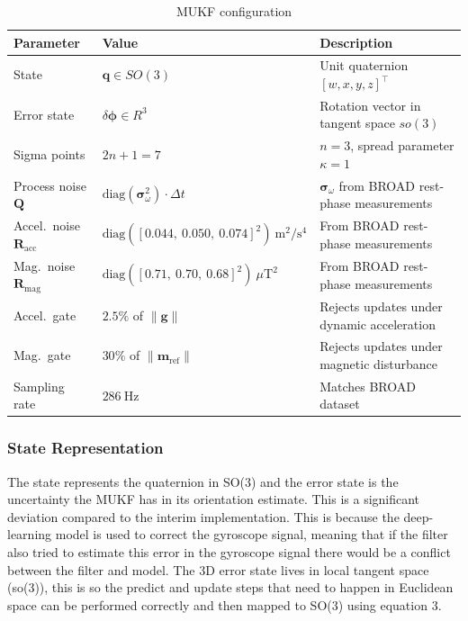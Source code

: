 \begin{table}[h]
\centering
\begin{tabular}{lll}
\hline
\textbf{Parameter} & \textbf{Value} & \textbf{Description} \\
\hline
State & $\mathbf{q} \in SO(3)$ & Unit quaternion $[w, x, y, z]^\top$ \\
Error state & $\delta\boldsymbol{\phi} \in {R}^3$ & Rotation vector in tangent space ${so}(3)$ \\
Sigma points & $2n+1 = 7$ & $n=3$, spread parameter $\kappa = 1$ \\
Process noise $\mathbf{Q}$ & $\text{diag}(\boldsymbol{\sigma}_{\omega}^2) \cdot \Delta t$ & $\boldsymbol{\sigma}_{\omega}$ from BROAD rest-phase measurements \\
Accel.\ noise $\mathbf{R}_{\text{acc}}$ & $\text{diag}([0.044,\ 0.050,\ 0.074]^2)\ \text{m}^2/\text{s}^4$ & From BROAD rest-phase measurements \\
Mag.\ noise $\mathbf{R}_{\text{mag}}$ & $\text{diag}([0.71,\ 0.70,\ 0.68]^2)\ \mu\text{T}^2$ & From BROAD rest-phase measurements \\
Accel.\ gate & $2.5\%$ of $\|\mathbf{g}\|$ & Rejects updates under dynamic acceleration \\
Mag.\ gate & $30\%$ of $\|\mathbf{m}_{\text{ref}}\|$ & Rejects updates under magnetic disturbance \\
Sampling rate & $286\ \text{Hz}$ & Matches BROAD dataset \\


\hline
\end{tabular}
\caption{MUKF configuration}
\label{tab:mukf_config}
\end{table}

\subsubsection{State Representation}
The state represents the quaternion in SO(3) and the error state is the uncertainty the MUKF has in its orientation estimate. This is a significant deviation compared to the 
interim implementation. This is because the deep-learning model is used to correct the gyroscope signal, meaning that if the filter also tried to 
estimate this error in the gyroscope signal there would be a conflict between the filter and model. The 3D error state lives in local tangent space (so(3)),
this is so the predict and update steps that need to happen in Euclidean space can be performed correctly and then mapped to SO(3) using equation 3.
 
